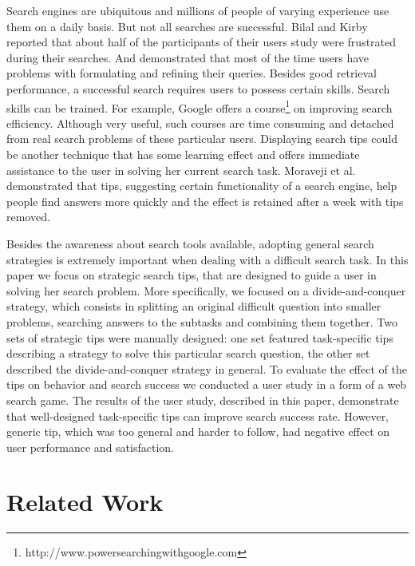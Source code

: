\documentclass{sig-alternate}
\begin{document}
Search engines are ubiquitous and millions of people of varying experience use them on a daily basis.
But not all searches are successful.
Bilal and Kirby \cite{Bilal:2002:DSI:637512.637516} reported that about half of the participants of their users study were frustrated during their searches.
And \cite{xie2009understanding} demonstrated that most of the time users have problems with formulating and refining their queries.
Besides good retrieval performance, a successful search requires users to possess certain skills.
Search skills can be trained. For example, Google offers a course\footnote{http://www.powersearchingwithgoogle.com} on improving search efficiency.
Although very useful, such courses are time consuming and detached from real search problems of these particular users. 
Displaying search tips could be another technique that has some learning effect and offers immediate assistance to the user in solving her current search task.
Moraveji et al. \cite{Moraveji:2011:MIU:2009916.2009966} demonstrated that tips, suggesting certain functionality of a search engine, help people find answers more quickly and the effect is retained after a week with tips removed.

Besides the awareness about search tools available, adopting general search strategies is extremely important when dealing with a difficult search task.
In this paper we focus on strategic search tips, that are designed to guide a user in solving her search problem.
More specifically, we focused on a divide-and-conquer strategy, which consists in splitting an original difficult question into smaller problems, searching answers to the subtasks and combining them together.
Two sets of strategic tips were manually designed: one set featured task-specific tips describing a strategy to solve this particular search question, the other set described the divide-and-conquer strategy in general.
To evaluate the effect of the tips on behavior and search success we conducted a user study in a form of a web search game.
The results of the user study, described in this paper, demonstrate that well-designed task-specific tips can improve search success rate.
However, generic tip, which was too general and harder to follow, had negative effect on user performance and satisfaction.

\section{Related Work}
\end{document}
